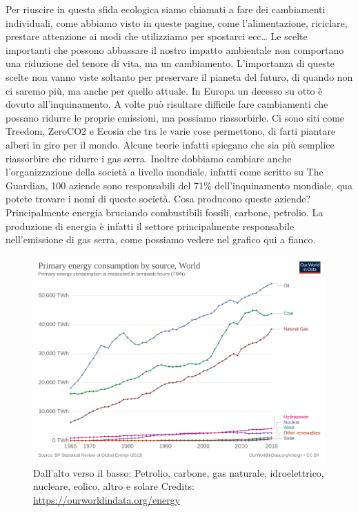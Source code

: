 \documentclass[12pt]{book} %
\begin{document}
Per riuscire in questa sfida ecologica siamo chiamati a fare dei cambiamenti individuali, come abbiamo visto in queste
pagine, come l'alimentazione, riciclare, prestare attenzione ai modi che utilizziamo per spostarci
ecc… Le scelte importanti che possono abbassare il nostro impatto ambientale non comportano una riduzione del tenore di
vita, ma un cambiamento. L'importanza di queste scelte non vanno viste soltanto per preservare il
pianeta del futuro, di quando non ci saremo più, ma anche per quello attuale. In Europa un decesso su otto è dovuto
all'inquinamento. A volte può risultare difficile fare cambiamenti che possano ridurre le proprie emissioni, ma possiamo
riassorbirle. Ci sono siti come Treedom, ZeroCO2 e Ecosia che tra le varie cose permettono, di farti piantare alberi in
giro per il mondo. Alcune teorie infatti spiegano che sia più semplice riassorbire che ridurre i gas serra. Inoltre
dobbiamo cambiare anche l'organizzazione della società a livello mondiale, infatti come scritto su
The Guardian, 100 aziende sono responsabili del 71\% dell'inquinamento
mondiale, qua
potete trovare i nomi di queste
società. Cosa producono queste aziende? Principalmente energia bruciando combustibili fossili, carbone, petrolio. La
produzione di energia è infatti il settore principalmente responsabile nell'emissione di gas
serra, come possiamo vedere nel grafico qui a fianco.

\begin{figure}[H]
  \centering
  \includegraphics[width=0.95\linewidth]{images/Libro-img025.png}
  \caption{Dall'alto verso il basso: Petrolio, carbone, gas naturale, idroelettrico, nucleare, eolico, altro e solare
  Credits: \protect\url{https://ourworldindata.org/energy} }
\end{figure}
\end{document}
